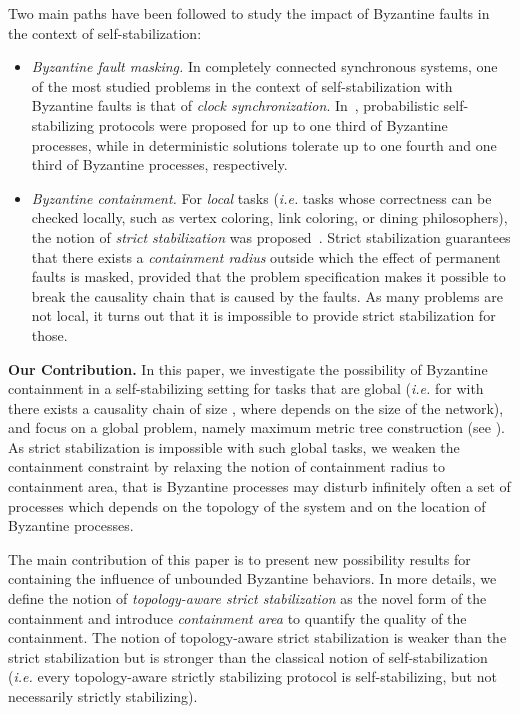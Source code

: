 \documentclass[11pt]{article}
\begin{document}
Two main paths have been followed to study the impact of Byzantine faults in the context of self-stabilization:
\begin{itemize}
\item \emph{Byzantine fault masking.} In completely connected synchronous systems, one of the most studied problems in the context of self-stabilization with Byzantine faults is that of \emph{clock synchronization}. In~\cite{BDH08c,DW04j}, probabilistic self-stabilizing protocols were proposed for up to one third of Byzantine processes, while in \cite{DH07cb,HDD06c} deterministic solutions tolerate up to one fourth and one third of Byzantine processes, respectively.
\item \emph{Byzantine containment.} For \emph{local} tasks (\emph{i.e.} tasks whose correctness can be checked locally, such as vertex coloring, link coloring, or dining philosophers), the notion of \emph{strict stabilization} was proposed~\cite{NA02c,SOM05c,MT07j}. Strict stabilization guarantees that there exists a \emph{containment radius} outside which the effect of permanent faults is masked, provided that the problem specification makes it possible to break the causality chain that is caused by the faults. As many problems are not local, it turns out that it is impossible to provide strict stabilization for those.
\end{itemize}

\noindent\textbf{Our Contribution.} In this paper, we investigate the possibility of Byzantine containment in a self-stabilizing setting for tasks that are global (\emph{i.e.} for with there exists a causality chain of size , where  depends on  the size of the network), and focus on a global problem, namely maximum metric tree construction (see \cite{GS99c,GS03j}). As strict stabilization is impossible with such global tasks, we weaken the containment constraint by relaxing the notion of containment radius to containment area, that is Byzantine processes may disturb infinitely often a set of processes which depends on the topology of the system and on the location of Byzantine processes.

The main contribution of this paper is to present new possibility results for containing the influence of unbounded Byzantine behaviors. In more details, we define the notion of \emph{topology-aware strict stabilization} as the novel form of the containment and introduce \emph{containment area} to quantify the quality of the containment.
The notion of topology-aware strict stabilization is weaker than the strict stabilization but is stronger than the classical notion of self-stabilization (\emph{i.e.} every topology-aware strictly stabilizing protocol is self-stabilizing, but not necessarily strictly stabilizing).
\end{document}
